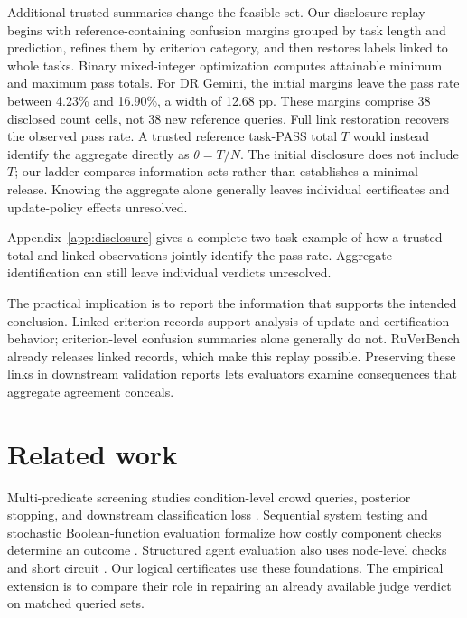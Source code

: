 \documentclass[10pt,letterpaper]{article}
\begin{document}
Additional trusted summaries change the feasible set. Our disclosure replay begins with reference-containing confusion margins grouped by task length and prediction, refines them by criterion category, and then restores labels linked to whole tasks. Binary mixed-integer optimization computes attainable minimum and maximum pass totals. For DR Gemini, the initial margins leave the pass rate between 4.23\% and 16.90\%, a width of 12.68 pp. These margins comprise 38 disclosed count cells, not 38 new reference queries. Full link restoration recovers the observed pass rate. A trusted reference task-PASS total $T$ would instead identify the aggregate directly as $\theta=T/N$. The initial disclosure does not include $T$; our ladder compares information sets rather than establishes a minimal release. Knowing the aggregate alone generally leaves individual certificates and update-policy effects unresolved.

Appendix~\ref{app:disclosure} gives a complete two-task example of how a trusted total and linked observations jointly identify the pass rate. Aggregate identification can still leave individual verdicts unresolved.

The practical implication is to report the information that supports the intended conclusion. Linked criterion records support analysis of update and certification behavior; criterion-level confusion summaries alone generally do not. RuVerBench already releases linked records, which make this replay possible. Preserving these links in downstream validation reports lets evaluators examine consequences that aggregate agreement conceals.

\section{Related work}\label{sec:related}
Multi-predicate screening studies condition-level crowd queries, posterior stopping, and downstream classification loss \citep{krivosheev2018hybrid,krivosheev2018screening,krivosheev2020active}. Sequential system testing and stochastic Boolean-function evaluation formalize how costly component checks determine an outcome \citep{unluyurt2004sequential,gkenosis2022sbfe,ghuge2026certification}. Structured agent evaluation also uses node-level checks and short circuit \citep{gou2025mind2web2}. Our logical certificates use these foundations. The empirical extension is to compare their role in repairing an already available judge verdict on matched queried sets.
\end{document}
